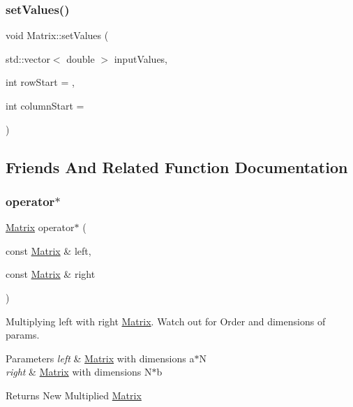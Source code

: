 \mbox{\label{classMatrix_a08f522fc56b7649a4242e7a0aefdfadd}} 
\subsubsection{\texorpdfstring{set\+Values()}{setValues()}}
{\footnotesize\ttfamily void Matrix\+::set\+Values (\begin{DoxyParamCaption}\item[{std\+::vector$<$ double $>$}]{input\+Values,  }\item[{int}]{row\+Start = {},  }\item[{int}]{column\+Start = {} }\end{DoxyParamCaption})}



\subsection{Friends And Related Function Documentation}
\mbox{\label{classMatrix_a6b58c286243be002bf669704ad15353a}} 
\subsubsection{\texorpdfstring{operator$\ast$}{operator*}}
{\footnotesize\ttfamily \hyperlink{classMatrix}{Matrix} operator$\ast$ (\begin{DoxyParamCaption}\item[{const \hyperlink{classMatrix}{Matrix} \&}]{left,  }\item[{const \hyperlink{classMatrix}{Matrix} \&}]{right }\end{DoxyParamCaption})\hspace{0.3cm}{\ttfamily [friend]}}

Multiplying left with right \hyperlink{classMatrix}{Matrix}. Watch out for Order and dimensions of params. 
\begin{DoxyParams}{Parameters}
{\em left} & \hyperlink{classMatrix}{Matrix} with dimensions a$\ast$N \\
\hline
{\em right} & \hyperlink{classMatrix}{Matrix} with dimensions N$\ast$b \\
\hline
\end{DoxyParams}
\begin{DoxyReturn}{Returns}
New Multiplied \hyperlink{classMatrix}{Matrix} 
\end{DoxyReturn}
\mbox{\label{classMatrix_a9407333bda2f3bf7b8a7ca9bec61b8ce}} 
